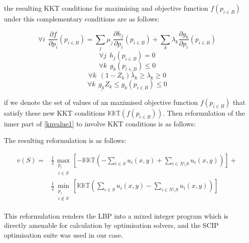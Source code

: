 the resulting KKT conditions for maximising and objective function $f(p_{i\in B})$ under this complementary \DIFdelbegin {}\DIFdelend \DIFaddbegin {}\DIFaddend conditions are as follows:

\begin{equation}\forall i~~\frac{\partial f}{\partial p_i}(p_{i\in B})=\sum_j\mu_j\frac{\partial h_j}{\partial p_i}(p_{i\in B}) + \sum_k\lambda_k\frac{\partial g_k}{\partial p_i}(p_{i\in B})\end{equation}
\begin{equation}\forall j~~ h_j(p_{i\in B})=0\end{equation}
\begin{equation}\forall k~~ g_k(p_{i\in B})\le 0\end{equation}
\begin{equation}\forall k~~ (1-Z_k)\bar{\lambda}_k \ge \lambda_k \ge 0\end{equation}
\begin{equation}\forall k~~ \underline{g_k}Z_k\le g_k(p_{i\in B}) \le 0\end{equation}

if we denote the set of values of an maximised objective function $f(p_{i\in B})$ that satisfy these new KKT conditions $\mathbb{KKT}(f(p_{i\in B}))$.
Then reformulation of the inner part of \eqref{knvalue1} to involve KKT conditions is as follows:

The resulting reformulation is as follows:

\begin{equation}
\label{optimization_eq1}
\begin{aligned}
v(S) =
&\frac{1}{2}\max_{\substack{p_i \\ i\in S}}   \left[-\mathbb{KKT}\left(-\sum_{i\in S} u_i(x,y) + \sum_{i\in N\setminus S}u_i(x,y)\right)\right] +\\
&\frac{1}{2}\min_{\substack{p_i \\ i\notin S}}\left[\mathbb{KKT}\left(\sum_{i\in S} u_i(x,y) - \sum_{i\in N\setminus S}u_i(x,y)\right)\right]
\end{aligned}
\end{equation}

This reformulation renders the LBP into a mixed integer program which is directly amenable for calculation by optimisation solvers, and the SCIP optimisation suite was used in our case.


